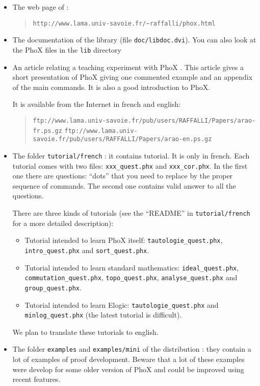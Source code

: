 \begin{itemize}
\item The web page of \AFD:

\begin{quote}
\verb#http://www.lama.univ-savoie.fr/~raffalli/phox.html#
\end{quote}

\item The documentation of the library (file \verb#doc/libdoc.dvi#).
 You can also look at the PhoX files in the \verb#lib# directory 


\item An article relating a teaching experiment with PhoX
\cite{RD01}. This article gives a short presentation of PhoX giving
one commented example and an appendix of the main commands. It is also
 a good introduction to PhoX.

It is available from the Internet in french and english:
\begin{quote}
\verb#ftp://www.lama.univ-savoie.fr/pub/users/RAFFALLI/Papers/arao-fr.ps.gz#
\verb#ftp://www.lama.univ-savoie.fr/pub/users/RAFFALLI/Papers/arao-en.ps.gz#
\end{quote}

\item The folder \verb#tutorial/french# : it contains tutorial. 
It is only in french. Each tutorial comes with two files:
\verb#xxx_quest.phx# and \verb#xxx_cor.phx#. In the first one there are
questions: 
``dots'' that you need to replace by the proper sequence of
commands. The second one contains valid answer to all the questions.

There are three kinds of tutorials (see the ``README'' in
\verb#tutorial/french# for a more detailed description):
\begin{itemize}
\item Tutorial intended to learn PhoX itself:
\verb#tautologie_quest.phx#,
\verb#intro_quest.phx# and
\verb#sort_quest.phx#.
\item Tutorial intended to learn standard mathematics:
\verb#ideal_quest.phx#,
               \verb#commutation_quest.phx#, \verb#topo_quest.phx#,
               \verb#analyse_quest.phx# and \verb#group_quest.phx#.
\item Tutorial intended to learn Elogic:
\verb#tautologie_quest.phx# and \verb#minlog_quest.phx# (the latest
tutorial is difficult).
\end{itemize}

We plan to translate these tutorials to english.


\item The folder \verb#examples# and \verb#examples/mini# of the distribution : they contain a lot of
examples of proof development. Beware that a lot of these examples
were develop for some older version of PhoX and could be improved
using recent features.


\end{itemize}





        

